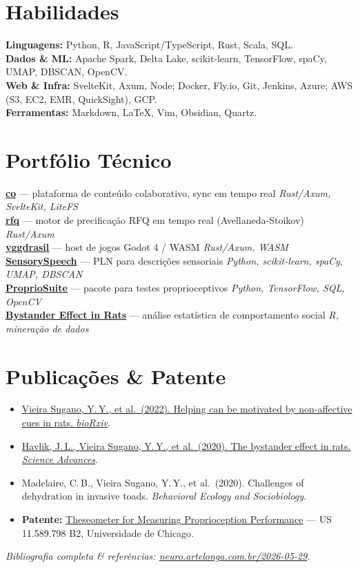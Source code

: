 \documentclass[a4paper,10pt]{article}
\begin{document}
\section*{Habilidades}
\textbf{Linguagens:} Python, R, JavaScript/TypeScript, Rust, Scala, SQL.\\
\textbf{Dados \& ML:} Apache Spark, Delta Lake, scikit-learn, TensorFlow, spaCy, UMAP, DBSCAN, OpenCV.\\
\textbf{Web \& Infra:} SvelteKit, Axum, Node; Docker, Fly.io, Git, Jenkins, Azure; AWS (S3, EC2, EMR, QuickSight), GCP.\\
\textbf{Ferramentas:} Markdown, LaTeX, Vim, Obsidian, Quartz.

\section*{Portfólio Técnico}
\href{https://co.artelonga.com.br}{\textbf{co}} --- plataforma de conteúdo colaborativo, sync em tempo real
\hfill \textit{Rust/Axum, SvelteKit, LiteFS}\\
\href{https://rfq.artelonga.com.br}{\textbf{rfq}} --- motor de precificação RFQ em tempo real (Avellaneda-Stoikov)
\hfill \textit{Rust/Axum}\\
\href{https://yggdrasil.artelonga.com.br}{\textbf{yggdrasil}} --- host de jogos Godot 4 / WASM
\hfill \textit{Rust/Axum, WASM}\\
\href{https://github.com/yurisugano/SensorySpeech}{\textbf{SensorySpeech}} --- PLN para descrições
sensoriais \hfill \textit{Python, scikit-learn, spaCy, UMAP, DBSCAN}\\
\href{https://github.com/yurisugano/ProprioSuite}{\textbf{ProprioSuite}} --- pacote para testes
proprioceptivos \hfill \textit{Python, TensorFlow, SQL, OpenCV}\\
\href{https://github.com/yurisugano/Bystander-Effect-Rat-Analysis}{\textbf{Bystander Effect in Rats}}
--- análise estatística de comportamento social \hfill \textit{R, mineração de dados}

\section*{Publicações \& Patente}
\begin{itemize}
  \item \href{https://doi.org/10.1101/2022.07.01.498150}{Vieira Sugano, Y.\,Y., et al.\ (2022). Helping can be motivated by non-affective cues in rats. \textit{bioRxiv}}.
  \item \href{https://doi.org/10.1126/sciadv.abb4205}{Havlik, J.\,L., Vieira Sugano, Y.\,Y., et al.\ (2020). The bystander effect in rats. \textit{Science Advances}}.
  \item Madelaire, C.\,B., Vieira Sugano, Y.\,Y., et al.\ (2020). Challenges of dehydration in invasive toads. \textit{Behavioral Ecology and Sociobiology}.
  \item \textbf{Patente:} \href{https://patents.google.com/patent/US11589798B2/en}{Theseometer for Measuring Proprioception Performance} — US 11.589.798 B2, Universidade de Chicago.
\end{itemize}

\vspace{2pt}\textit{\small Bibliografia completa \& referências: \href{https://neuro.artelonga.com.br/2026-05-29/}{neuro.artelonga.com.br/2026-05-29}.}
\end{document}
